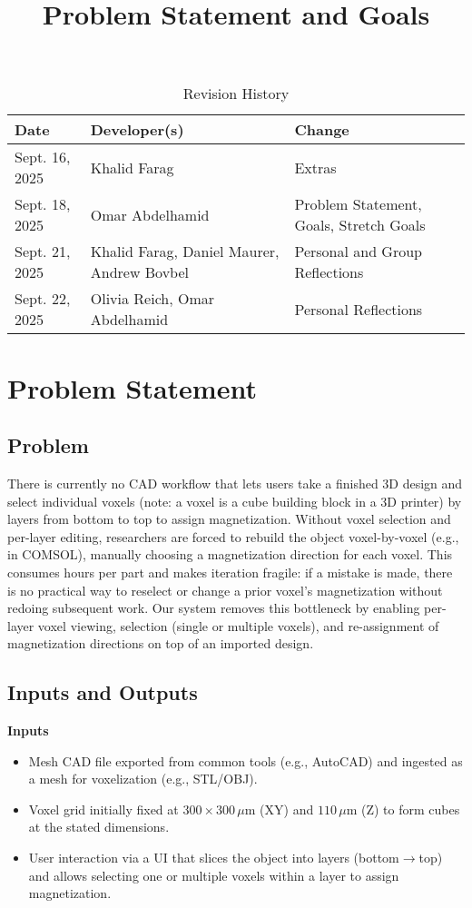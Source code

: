 \documentclass{article}
\title{Problem Statement and Goals\\\progname}
\author{\authname}
\date{}
\begin{document}
\maketitle

\begin{table}[hp]
\caption{Revision History} \label{TblRevisionHistory}
\begin{tabularx}{\textwidth}{llX}
\toprule
\textbf{Date} & \textbf{Developer(s)} & \textbf{Change}\\
\midrule
Sept. 16, 2025 & Khalid Farag & Extras\\
Sept. 18, 2025 & Omar Abdelhamid & Problem Statement, Goals, Stretch Goals\\
Sept. 21, 2025 & Khalid Farag, Daniel Maurer, Andrew Bovbel & Personal and Group Reflections\\
Sept. 22, 2025 & Olivia Reich, Omar Abdelhamid & Personal Reflections\\
\bottomrule
\end{tabularx}
\end{table}

\section{Problem Statement}


\subsection{Problem}
There is currently no CAD workflow that lets users take a finished 3D design and
select individual voxels (note: a voxel is a cube building block in a 3D printer) by layers from bottom to top to assign
magnetization. Without voxel selection and per-layer editing, researchers are
forced to rebuild the object voxel-by-voxel (e.g., in COMSOL), manually choosing
a magnetization direction for each voxel. This consumes hours per part and
makes iteration fragile: if a mistake is made, there is no practical way to
reselect or change a prior voxel’s magnetization without redoing subsequent work.
Our system removes this bottleneck by enabling per-layer voxel viewing,
selection (single or multiple voxels), and re-assignment of magnetization
directions on top of an imported design.


\subsection{Inputs and Outputs}
\textbf{Inputs}
\begin{itemize}
  \item Mesh CAD file exported from common tools (e.g., AutoCAD) and ingested as a mesh for voxelization (e.g., STL/OBJ).
  \item Voxel grid initially fixed at $300 \times 300\,\mu\text{m}$ (XY) and $110\,\mu\text{m}$ (Z) to form cubes at the stated dimensions.
  \item User interaction via a UI that slices the object into layers (bottom$\rightarrow$top) and allows selecting one or multiple voxels within a layer to assign magnetization.
\end{itemize}
\end{document}
